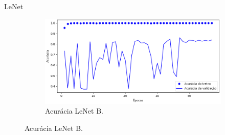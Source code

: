 \begin{frame}{LeNet}
\begin{figure}[h!]
\begin{subfigure}{0.3\linewidth}
    \end{subfigure}
    \hspace{1.5cm}
    \begin{subfigure}{0.3\linewidth}
      \caption{Acurácia LeNet B.\label{subfig:lenet-b-acc}}
      \includegraphics[width=\linewidth]{img/lenet-b-acc}%
    \end{subfigure}
    \label{fig:treinamento-lenet}
  \end{figure}

\end{frame}

